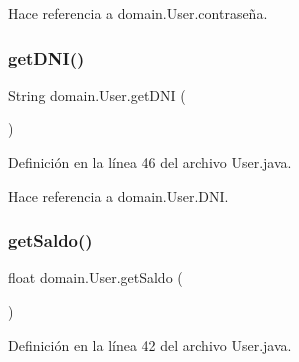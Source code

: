 \begin{DoxyCode}{0}

\end{DoxyCode}


Hace referencia a domain.\+User.\+contraseña.

\mbox{\label{classdomain_1_1User_a9a0a7affd1ab9ba7d882317d5da47888}} 
\subsubsection{\texorpdfstring{getDNI()}{getDNI()}}
{\footnotesize\ttfamily String domain.\+User.\+get\+D\+NI (\begin{DoxyParamCaption}{ }\end{DoxyParamCaption})}



Definición en la línea 46 del archivo User.\+java.


\begin{DoxyCode}{0}

\end{DoxyCode}


Hace referencia a domain.\+User.\+D\+NI.

\mbox{\label{classdomain_1_1User_ab3b58a7e3f345ddf8df5b87ad772b7d5}} 
\subsubsection{\texorpdfstring{getSaldo()}{getSaldo()}}
{\footnotesize\ttfamily float domain.\+User.\+get\+Saldo (\begin{DoxyParamCaption}{ }\end{DoxyParamCaption})}



Definición en la línea 42 del archivo User.\+java.


